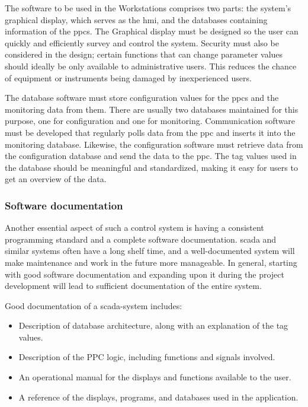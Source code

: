 \documentclass[main.tex]{subfiles}
\begin{document}
The software to be used in the Workstations comprises two parts: the system's graphical display, which serves as the \gls{hmi}, and the databases containing information of the \gls{ppc}s. The Graphical display must be designed so the user can quickly and efficiently survey and control the system. Security must also be considered in the design; certain functions that can change parameter values should ideally be only available to administrative users. This reduces the chance of equipment or instruments being damaged by inexperienced users.

The database software must store configuration values for the \gls{ppc}s and the monitoring data from them. There are usually two databases maintained for this purpose, one for configuration and one for monitoring. Communication software must be developed that regularly polls data from the \gls{ppc} and inserts it into the monitoring database. Likewise, the configuration software must retrieve data from the configuration database and send the data to the \gls{ppc}. The tag values used in the database should be meaningful and standardized, making it easy for users to get an overview of the data.



\subsubsection{Software documentation}
Another essential aspect of such a control system is having a consistent programming standard and a complete software documentation. \gls{scada} and similar systems often have a long shelf time, and a well-documented system will make maintenance and work in the future more manageable. In general, starting with good software documentation and expanding upon it during the project development will lead to sufficient documentation of the entire system.

Good documentation of a \gls{scada}-system includes:

\begin{itemize}
    \item Description of database architecture, along with an explanation of the tag values.
    \item Description of the PPC logic, including functions and signals involved.
    \item An operational manual for the displays and functions available to the user.
    \item A reference of the displays, programs, and databases used in the application.
\end{itemize}
\end{document}
